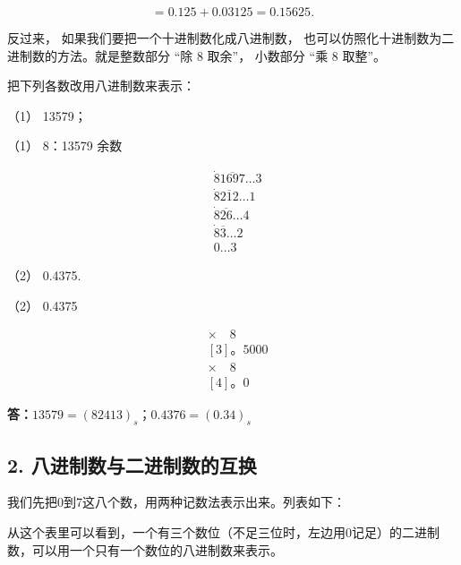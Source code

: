 \[
= 0.125 + 0.03125 = 0.15625.
\]

反过来， 如果我们要把一个十进制数化成八进制数，
也可以仿照化十进制数为二进制数的方法。就是整数部分 ``除 8 取余''，
小数部分 ``乘 8 取整''。

 把下列各数改用八进制数来表示：


（1） 13579；

（1） 8：13579 余数

\[
\begin{array}{rl} & \dot {8} \overline {{1697}} \dots 3 \\ & \dot {8} \overline {{212}} \dots 1 \\ & \dot {8} \overline {{26}} \dots 4 \\ & \dot {8} \overline {{3}} \dots 2 \\ \hline {} & 0 \dots 3 \end{array}
\]

（2） 0.4375.

（2） 0.4375

\[
\begin{array}{rl} & \times \quad 8 \\ \hline {} & [ 3 ]\text{。} 5000 \\ & \times \quad 8 \\ \hline {} & [ 4 ]\text{。} 0 \end{array}
\]

\textbf{答：}\(13579 = (82413)_{s}\)；\(0.4376 = (0.34)_{s}\)

\subsection{2. 八进制数与二进制数的互换}

我们先把0到7这八个数，用两种记数法表示出来。列表如下：

{\centering
\small\setlength{\tabcolsep}{3pt}%
\par
}

从这个表里可以看到，一个有三个数位（不足三位时，左边用0记足）的二进制数，可以用一个只有一个数位的八进制数来表示。

